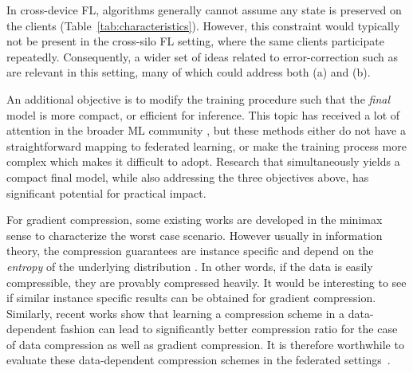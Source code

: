 \documentclass[11pt]{article}
\begin{document}
In cross-device FL, algorithms generally cannot assume any state is preserved on the clients (Table~\ref{tab:characteristics}). However, this constraint would typically not be present in the cross-silo FL setting, where the same clients participate repeatedly. Consequently, a wider set of ideas related to error-correction such as \citep{lin2017deep, sattler2019robust, vogels2019powersgd, tang2019texttt, karimireddy2019ef, stich2019error} are relevant in this setting, many of which could address both (a) and (b).

An additional objective is to modify the training procedure such that the \emph{final} model is more compact, or efficient for inference. This topic has received a lot of attention in the broader ML community \citep{han2015deep, courbariaux2015binaryconnect, zhu2017prune, lin2016fixed, oktay2019model, blalock2020state}, but these methods either do not have a straightforward mapping to federated learning, or make the training process more complex which makes it difficult to adopt. Research that simultaneously yields a compact final model, while also addressing the three objectives above, has significant potential for practical impact.

For gradient compression, some existing works \cite{suresh2017distributed} are developed in the minimax sense to characterize the worst case scenario. However usually in information theory, the compression guarantees are instance specific and depend on the \emph{entropy} of the underlying distribution \cite{cover2012elements}. In other words, if the data is easily compressible, they are provably compressed heavily. It would be interesting to see if similar instance specific results can be obtained for gradient compression. Similarly, recent works show that learning a compression scheme in a data-dependent fashion can lead to significantly better compression ratio for the case of data compression \cite{wu2017multiscale} as well as gradient compression. It is therefore worthwhile to evaluate these data-dependent compression schemes in the federated settings~\cite{gandikota2019vqsgd}.
\end{document}
